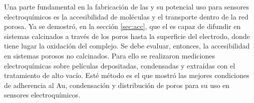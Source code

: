 	  Una parte fundamental en la fabricación de las \pdm\space y su potencial uso para sensores electroquímicos es la accesibilidad de moléculas y el transporte dentro de la red porosa. Ya se demostró, en la sección \ref{sec:acc}, que el \aminorutenio\space es capaz de difundir en sistemas calcinados a través de los poros hasta la superficie del electrodo, donde tiene lugar la oxidación del complejo. Se debe evaluar, entonces, la accesibilidad en sistemas porosos no calcinados. Para ello se realizaron mediciones electroquímicas sobre películas depositadas, condensadas y extraídas con el tratamiento de alto vacío. Esté método es el que mostró las mejores condiciones de adherencia al Au, condensación y distribución de poros para su uso en sensores electroquímicos. 

